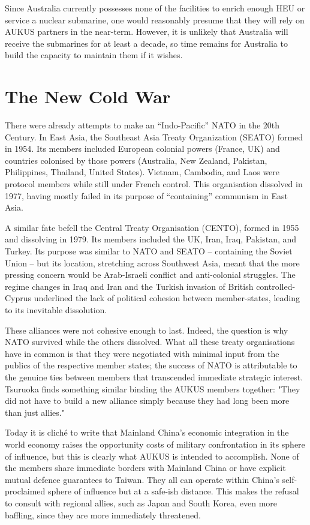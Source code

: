 \documentclass[letterpaper,12pt,twoside]{article} %
\begin{document}
\begin{multicols}{2}
Since Australia currently possesses none of the facilities to enrich enough HEU or service a nuclear submarine, one would reasonably presume that they will rely on AUKUS partners in the near-term. However, it is unlikely that Australia will receive the submarines for at least a decade,\autocite{tsuruoka2021aukus} so time remains for Australia to build the capacity to maintain them if it wishes.

\vfill
\pagebreak
\section{The New Cold War}

There were already attempts to make an ``Indo-Pacific'' NATO in the 20th Century. In East Asia, the Southeast Asia Treaty Organization (SEATO) formed in 1954. Its members included European colonial powers (France, UK) and countries colonised by those powers (Australia, New Zealand, Pakistan, Philippines, Thailand, United States). Vietnam, Cambodia, and Laos were protocol members while still under French control. This organisation dissolved in 1977, having mostly failed in its purpose of ``containing'' communism in East Asia.

A similar fate befell the Central Treaty Organisation (CENTO), formed in 1955 and dissolving in 1979. Its members included the UK, Iran, Iraq, Pakistan, and Turkey. Its purpose was similar to NATO and SEATO -- containing the Soviet Union -- but its location, stretching across Southwest Asia, meant that the more pressing concern would be Arab-Israeli conflict and anti-colonial struggles. The regime changes in Iraq and Iran and the Turkish invasion of British controlled-Cyprus underlined the lack of political cohesion between member-states, leading to its inevitable dissolution.

These alliances were not cohesive enough to last. Indeed, the question is why NATO survived while the others dissolved. What all these treaty organisations have in common is that they were negotiated with minimal input from the publics of the respective member states; the success of NATO is attributable to the genuine ties between members that transcended immediate strategic interest. Tsuruoka finds something similar binding the AUKUS members together: "They did not have to build a new alliance simply because they had long been more than just allies."\autocite[3]{tsuruoka2021aukus}

Today it is cliché to write that Mainland China's economic integration in the world economy raises the opportunity costs of military confrontation in its sphere of influence, but this is clearly what AUKUS is intended to accomplish. None of the members share immediate borders with Mainland China or have explicit mutual defence guarantees to Taiwan. They all can operate within China's self-proclaimed sphere of influence but at a safe-ish distance. This makes the refusal to consult with regional allies, such as Japan and South Korea, even more baffling, since they are more immediately threatened.


\end{multicols}
\end{document}
